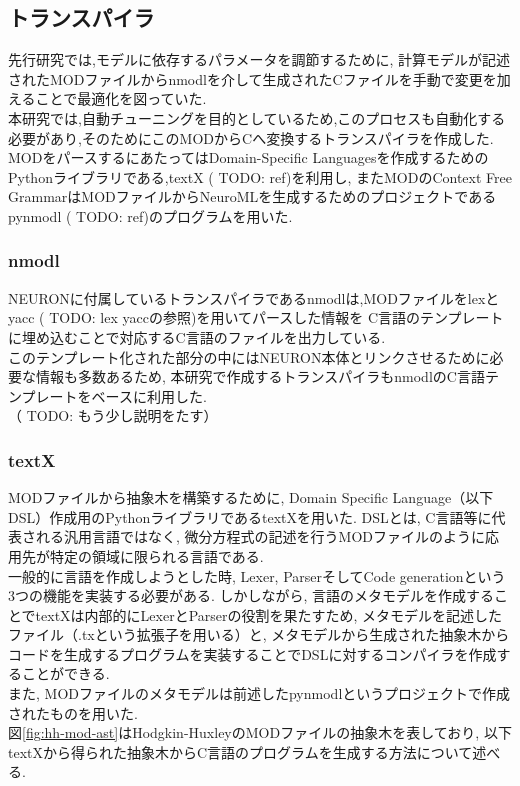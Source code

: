 \subsection{トランスパイラ}
先行研究\cite{miyamoto-master}では,モデルに依存するパラメータを調節するために,
計算モデルが記述されたMODファイルからnmodlを介して生成されたCファイルを手動で変更を加えることで最適化を図っていた.\\
本研究では,自動チューニングを目的としているため,このプロセスも自動化する必要があり,そのためにこのMODからCへ変換するトランスパイラを作成した.\\
MODをパースするにあたってはDomain-Specific Languagesを作成するためのPythonライブラリである,textX ( TODO: ref)を利用し,
またMODのContext Free GrammarはMODファイルからNeuroMLを生成するためのプロジェクトであるpynmodl ( TODO: ref)のプログラムを用いた.\\

\subsubsection{nmodl}
NEURONに付属しているトランスパイラであるnmodlは,MODファイルをlexとyacc ( TODO: lex yaccの参照)を用いてパースした情報を
C言語のテンプレートに埋め込むことで対応するC言語のファイルを出力している.\\
このテンプレート化された部分の中にはNEURON本体とリンクさせるために必要な情報も多数あるため,
本研究で作成するトランスパイラもnmodlのC言語テンプレートをベースに利用した.\\
（ TODO: もう少し説明をたす）

\subsubsection{textX}
MODファイルから抽象木を構築するために, Domain Specific Language（以下DSL）作成用のPythonライブラリであるtextX\cite{textX}を用いた.
DSLとは, C言語等に代表される汎用言語ではなく, 微分方程式の記述を行うMODファイルのように応用先が特定の領域に限られる言語である.\\
一般的に言語を作成しようとした時, Lexer, ParserそしてCode generationという3つの機能を実装する必要がある.
しかしながら, 言語のメタモデルを作成することでtextXは内部的にLexerとParserの役割を果たすため,
メタモデルを記述したファイル（.txという拡張子を用いる）と, メタモデルから生成された抽象木からコードを生成するプログラムを実装することでDSLに対するコンパイラを作成することができる.\\
また, MODファイルのメタモデルは前述したpynmodlというプロジェクトで作成されたものを用いた.\\
図\ref{fig:hh-mod-ast}はHodgkin-HuxleyのMODファイルの抽象木を表しており, 以下textXから得られた抽象木からC言語のプログラムを生成する方法について述べる.\\

